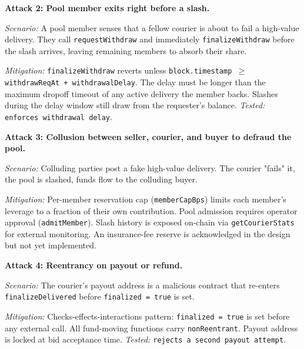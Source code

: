 \documentclass[12pt,a4paper]{article}
\begin{document}
\begin{attackbox}
\textbf{Attack 2: Pool member exits right before a slash.}

\textit{Scenario:} A pool member senses that a fellow courier is about to fail a high-value delivery. They call \texttt{requestWithdraw} and immediately \texttt{finalizeWithdraw} before the slash arrives, leaving remaining members to absorb their share.

\textit{Mitigation:} \texttt{finalizeWithdraw} reverts unless \texttt{block.timestamp $\geq$ withdrawReqAt + withdrawalDelay}. The delay must be longer than the maximum dropoff timeout of any active delivery the member backs. Slashes during the delay window still draw from the requester's balance. \textit{Tested:} \texttt{enforces withdrawal delay}.
\end{attackbox}

\begin{attackbox}
\textbf{Attack 3: Collusion between seller, courier, and buyer to defraud the pool.}

\textit{Scenario:} Colluding parties post a fake high-value delivery. The courier "fails" it, the pool is slashed, funds flow to the colluding buyer.

\textit{Mitigation:} Per-member reservation cap (\texttt{memberCapBps}) limits each member's leverage to a fraction of their own contribution. Pool admission requires operator approval (\texttt{admitMember}). Slash history is exposed on-chain via \texttt{getCourierStats} for external monitoring. An insurance-fee reserve is acknowledged in the design but not yet implemented.
\end{attackbox}

\begin{attackbox}
\textbf{Attack 4: Reentrancy on payout or refund.}

\textit{Scenario:} The courier's payout address is a malicious contract that re-enters \texttt{finalizeDelivered} before \texttt{finalized = true} is set.

\textit{Mitigation:} Checks-effects-interactions pattern: \texttt{finalized = true} is set before any external call. All fund-moving functions carry \texttt{nonReentrant}. Payout address is locked at bid acceptance time. \textit{Tested:} \texttt{rejects a second payout attempt}.
\end{attackbox}
\end{document}
